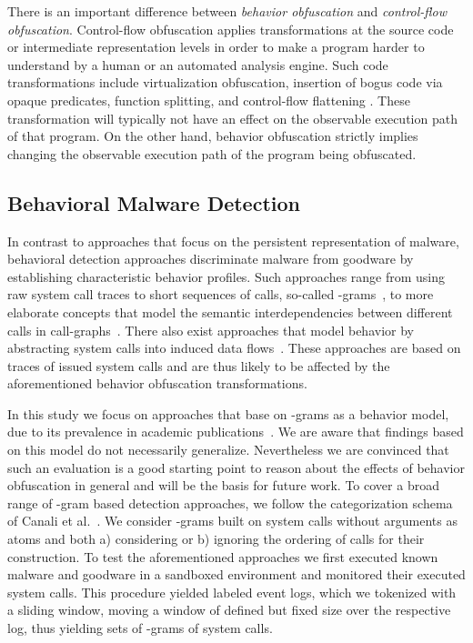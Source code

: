 \documentclass{llncs}
\begin{document}
There is an important difference between \emph{behavior obfuscation} and \emph{control-flow obfuscation}. Control-flow obfuscation applies transformations at the source code or intermediate representation levels in order to make a program harder to understand by a human or an automated analysis engine. Such code transformations include virtualization obfuscation, insertion of bogus code via opaque predicates, function splitting, and control-flow flattening \cite{Collberg2009}. These transformation will typically not have an effect on the observable execution path of that program. On the other hand, behavior obfuscation strictly implies changing the observable execution path of the program being obfuscated.

%
 
\subsection{Behavioral Malware Detection}

In contrast to approaches that focus on the persistent representation of malware, behavioral detection approaches discriminate malware from goodware by establishing characteristic behavior profiles. 
Such approaches range from using raw system call traces to short sequences of 
calls, so-called -grams~\cite{Forrest1996,Rieck2011,wressnegger2013}, to more elaborate concepts that model the semantic interdependencies between different calls in call-graphs~\cite{Park2013,Christodorescu2005,Christodorescu2008}. There also exist approaches that model behavior by abstracting system calls into induced data flows~\cite{Bhatkar2006,Cavallaro2011}. These approaches are based on traces of issued system calls and are thus likely to be affected by the aforementioned behavior obfuscation transformations.

In this study we focus on approaches that base on -grams as a behavior model, due to its prevalence in academic publications~\cite{wressnegger2013}. We are aware that findings based on this model do not necessarily generalize. Nevertheless we are convinced that such an evaluation is a good starting point to reason about the effects of behavior obfuscation in general and will be the basis for future work.
To cover a broad range of -gram based detection approaches, we follow the categorization schema of Canali et al.~\cite{canali2012quantitative}. We consider -grams built on system calls without arguments as atoms and both a) considering or b) ignoring the ordering of calls for their construction.
To test the aforementioned approaches we first executed known malware and goodware in a sandboxed environment and monitored their executed system calls. This procedure yielded labeled event logs, which we tokenized with a sliding window, moving a window of defined but fixed size over the respective log, thus yielding sets of -grams of system calls.
\end{document}
